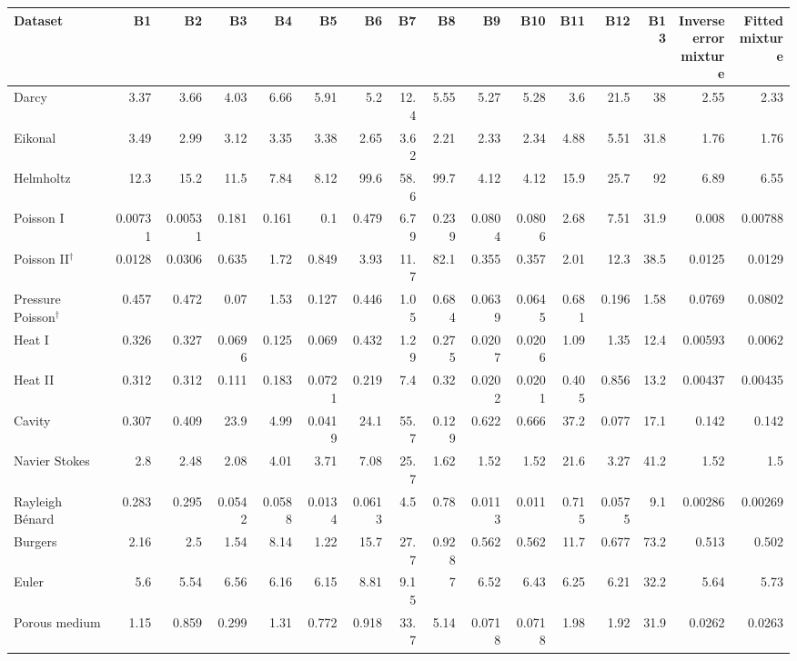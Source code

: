 \begin{tabular}{lrrrrrrrrrrrrrrr}
\toprule
Dataset & B1 & B2 & B3 & B4 & B5 & B6 & B7 & B8 & B9 & B10 & B11 & B12 & B13 & \shortstack[r]{Inverse\\error\\mixture} & \shortstack[r]{Fitted\\mixture} \\
\midrule
Darcy & 3.37 & 3.66 & 4.03 & 6.66 & 5.91 & 5.2 & 12.4 & 5.55 & 5.27 & 5.28 & 3.6 & 21.5 & 38 & 2.55 & 2.33 \\
Eikonal & 3.49 & 2.99 & 3.12 & 3.35 & 3.38 & 2.65 & 3.62 & 2.21 & 2.33 & 2.34 & 4.88 & 5.51 & 31.8 & 1.76 & 1.76 \\
Helmholtz & 12.3 & 15.2 & 11.5 & 7.84 & 8.12 & 99.6 & 58.6 & 99.7 & 4.12 & 4.12 & 15.9 & 25.7 & 92 & 6.89 & 6.55 \\
Poisson I & 0.00731 & 0.00531 & 0.181 & 0.161 & 0.1 & 0.479 & 6.79 & 0.239 & 0.0804 & 0.0806 & 2.68 & 7.51 & 31.9 & 0.008 & 0.00788 \\
Poisson II$^{\dagger}$ & 0.0128 & 0.0306 & 0.635 & 1.72 & 0.849 & 3.93 & 11.7 & 82.1 & 0.355 & 0.357 & 2.01 & 12.3 & 38.5 & 0.0125 & 0.0129 \\
Pressure Poisson$^{\dagger}$ & 0.457 & 0.472 & 0.07 & 1.53 & 0.127 & 0.446 & 1.05 & 0.684 & 0.0639 & 0.0645 & 0.681 & 0.196 & 1.58 & 0.0769 & 0.0802 \\
Heat I & 0.326 & 0.327 & 0.0696 & 0.125 & 0.069 & 0.432 & 1.29 & 0.275 & 0.0207 & 0.0206 & 1.09 & 1.35 & 12.4 & 0.00593 & 0.0062 \\
Heat II & 0.312 & 0.312 & 0.111 & 0.183 & 0.0721 & 0.219 & 7.4 & 0.32 & 0.0202 & 0.0201 & 0.405 & 0.856 & 13.2 & 0.00437 & 0.00435 \\
Cavity & 0.307 & 0.409 & 23.9 & 4.99 & 0.0419 & 24.1 & 55.7 & 0.129 & 0.622 & 0.666 & 37.2 & 0.077 & 17.1 & 0.142 & 0.142 \\
Navier Stokes & 2.8 & 2.48 & 2.08 & 4.01 & 3.71 & 7.08 & 25.7 & 1.62 & 1.52 & 1.52 & 21.6 & 3.27 & 41.2 & 1.52 & 1.5 \\
Rayleigh Bénard & 0.283 & 0.295 & 0.0542 & 0.0588 & 0.0134 & 0.0613 & 4.5 & 0.78 & 0.0113 & 0.011 & 0.715 & 0.0575 & 9.1 & 0.00286 & 0.00269 \\
Burgers & 2.16 & 2.5 & 1.54 & 8.14 & 1.22 & 15.7 & 27.7 & 0.928 & 0.562 & 0.562 & 11.7 & 0.677 & 73.2 & 0.513 & 0.502 \\
Euler & 5.6 & 5.54 & 6.56 & 6.16 & 6.15 & 8.81 & 9.15 & 7 & 6.52 & 6.43 & 6.25 & 6.21 & 32.2 & 5.64 & 5.73 \\
Porous medium & 1.15 & 0.859 & 0.299 & 1.31 & 0.772 & 0.918 & 33.7 & 5.14 & 0.0718 & 0.0718 & 1.98 & 1.92 & 31.9 & 0.0262 & 0.0263 \\

\end{tabular}
